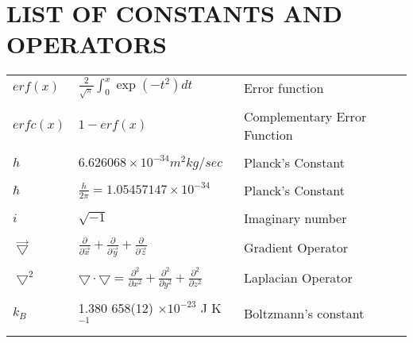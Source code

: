 \chapter*{LIST OF CONSTANTS AND OPERATORS}

\begin{tabular}{p{1.2in}p{2.5in}p{2.5in}}

$erf(x)$ & $\frac 2 {\sqrt{\pi}} \int_0^x \exp(-t^2) dt$ & Error function \\ \\

$erfc(x)$ & $1 - erf(x)$ & Complementary Error Function \\ \\

$h$ & $6.626068 \times 10 ^ {-34} m^2kg/sec$ & Planck's Constant \\ \\

$\hbar$ & $\frac h {2 \pi} = 1.05457147 \times 10 ^ {-34}$ & 
          Planck's Constant \\ \\

$i$ & $\sqrt{-1}$ & Imaginary number \\ \\

$\vec{\bigtriangledown}$ & $\frac{\partial}{\partial \vec{x}} +
\frac{\partial}{\partial \vec{y}} + \frac {\partial}{\partial \vec{z}}$ &
Gradient Operator \\ \\

$\bigtriangledown^2$ & $\bigtriangledown \cdot \bigtriangledown = \frac
{\partial ^2} {\partial x ^2} + \frac {\partial ^2} {\partial y^2} + \frac
{\partial ^2} {\partial z ^2}$ & Laplacian Operator \\ \\

$k_B$ & 1.380 658(12) $\times 10 ^ {-23}$ J K$^{-1}$ &
Boltzmann's constant \cite{CRC_Book} \\ \\

\end{tabular}
